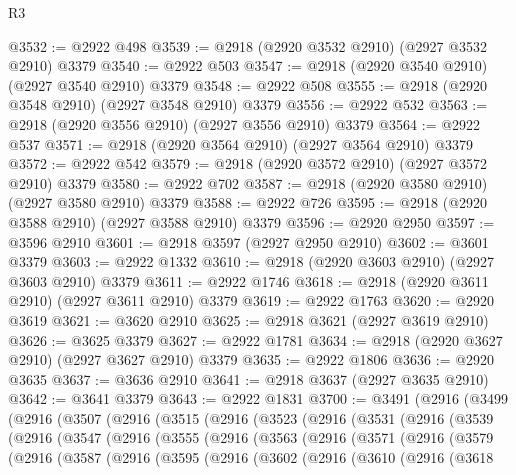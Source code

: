 \begin{lexlean}{R3}
\begin{coremodule}
@3532 := @2922 @498
@3539 := @2918 (@2920 @3532 @2910) (@2927 @3532 @2910) @3379
@3540 := @2922 @503
@3547 := @2918 (@2920 @3540 @2910) (@2927 @3540 @2910) @3379
@3548 := @2922 @508
@3555 := @2918 (@2920 @3548 @2910) (@2927 @3548 @2910) @3379
@3556 := @2922 @532
@3563 := @2918 (@2920 @3556 @2910) (@2927 @3556 @2910) @3379
@3564 := @2922 @537
@3571 := @2918 (@2920 @3564 @2910) (@2927 @3564 @2910) @3379
@3572 := @2922 @542
@3579 := @2918 (@2920 @3572 @2910) (@2927 @3572 @2910) @3379
@3580 := @2922 @702
@3587 := @2918 (@2920 @3580 @2910) (@2927 @3580 @2910) @3379
@3588 := @2922 @726
@3595 := @2918 (@2920 @3588 @2910) (@2927 @3588 @2910) @3379
@3596 := @2920 @2950
@3597 := @3596 @2910
@3601 := @2918 @3597 (@2927 @2950 @2910)
@3602 := @3601 @3379
@3603 := @2922 @1332
@3610 := @2918 (@2920 @3603 @2910) (@2927 @3603 @2910) @3379
@3611 := @2922 @1746
@3618 := @2918 (@2920 @3611 @2910) (@2927 @3611 @2910) @3379
@3619 := @2922 @1763
@3620 := @2920 @3619
@3621 := @3620 @2910
@3625 := @2918 @3621 (@2927 @3619 @2910)
@3626 := @3625 @3379
@3627 := @2922 @1781
@3634 := @2918 (@2920 @3627 @2910) (@2927 @3627 @2910) @3379
@3635 := @2922 @1806
@3636 := @2920 @3635
@3637 := @3636 @2910
@3641 := @2918 @3637 (@2927 @3635 @2910)
@3642 := @3641 @3379
@3643 := @2922 @1831
@3700 := @3491
    (@2916
      (@3499
        (@2916
          (@3507
            (@2916
              (@3515
                (@2916
                  (@3523
                    (@2916
                      (@3531
                        (@2916
                          (@3539
                            (@2916
                              (@3547
                                (@2916
                                  (@3555
                                    (@2916
                                      (@3563
                                        (@2916
                                          (@3571
                                            (@2916
                                              (@3579
                                                (@2916
                                                  (@3587
                                                    (@2916
                                                      (@3595
                                                        (@2916
                                                          (@3602
                                                            (@2916
                                                              (@3610
                                                                (@2916
                                                                  (@3618

\end{coremodule}
\end{lexlean}
